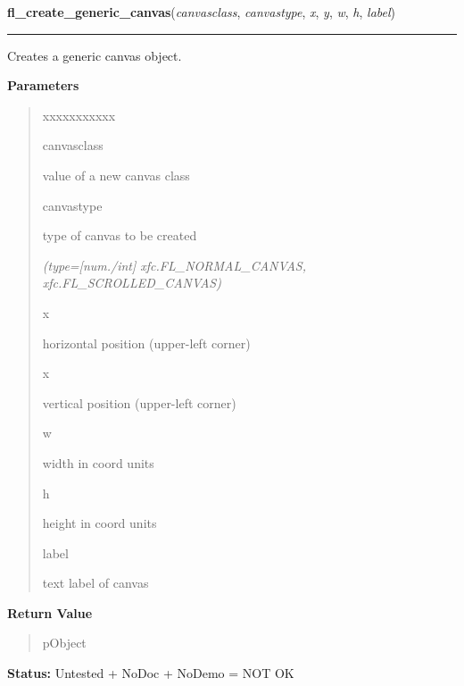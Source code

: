 \hspace{.8\funcindent}\begin{boxedminipage}{\funcwidth}

    \raggedright \textbf{fl\_create\_generic\_canvas}(\textit{canvasclass}, \textit{canvastype}, \textit{x}, \textit{y}, \textit{w}, \textit{h}, \textit{label})

    \vspace{-1.5ex}

    \rule{\textwidth}{0.5\fboxrule}
\setlength{\parskip}{2ex}
    Creates a generic canvas object.

\setlength{\parskip}{1ex}
      \textbf{Parameters}
      \vspace{-1ex}

      \begin{quote}
        \begin{Ventry}{xxxxxxxxxxx}

          \item[canvasclass]

          value of a new canvas class

          \item[canvastype]

          type of canvas to be created

            {\it (type=[num./int] xfc.FL\_NORMAL\_CANVAS, xfc.FL\_SCROLLED\_CANVAS)}

          \item[x]

          horizontal position (upper-left corner)

          \item[x]

          vertical position (upper-left corner)

          \item[w]

          width in coord units

          \item[h]

          height in coord units

          \item[label]

          text label of canvas

        \end{Ventry}

      \end{quote}

      \textbf{Return Value}
    \vspace{-1ex}

      \begin{quote}
      pObject

      \end{quote}

\textbf{Status:} Untested + NoDoc + NoDemo = NOT OK



    \end{boxedminipage}

